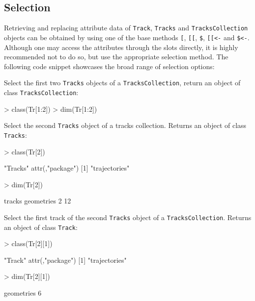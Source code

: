 \documentclass{article}
\newcommand{\code}[1]{{\tt #1}}
\begin{document}
\subsection{Selection}

Retrieving and replacing attribute data of \code{Track}, \code{Tracks} and \code{TracksCollection} objects can be obtained by using one of the base methods \code{[}, \code{[[}, \verb|$|, \code{[[<-} and \verb|$<-|. Although one may access the attributes through the slots directly, it is highly recommended not to do so, but use the appropriate selection method. The following code snippet showcases the broad range of selection options:

Select the first two \code{Tracks} objects of a \code{TracksCollection},
return an object of class \code{TracksCollection}:
\begin{Schunk}
\begin{Sinput}
> class(Tr[1:2])
> dim(Tr[1:2])
\end{Sinput}
\end{Schunk}
Select the second \code{Tracks} object of a tracks collection. Returns an
object of class \code{Tracks}:
\begin{Schunk}
\begin{Sinput}
> class(Tr[2])
\end{Sinput}
\begin{Soutput}
[1] "Tracks"
attr(,"package")
[1] "trajectories"
\end{Soutput}
\begin{Sinput}
> dim(Tr[2])
\end{Sinput}
\begin{Soutput}
    tracks geometries 
         2         12 
\end{Soutput}
\end{Schunk}
Select the first track of the second \code{Tracks} object of a 
\code{TracksCollection}. Returns an object of class \code{Track}:
\begin{Schunk}
\begin{Sinput}
> class(Tr[2][1])
\end{Sinput}
\begin{Soutput}
[1] "Track"
attr(,"package")
[1] "trajectories"
\end{Soutput}
\begin{Sinput}
> dim(Tr[2][1])
\end{Sinput}
\begin{Soutput}
geometries 
         6 
\end{Soutput}
\end{Schunk}
\end{document}
